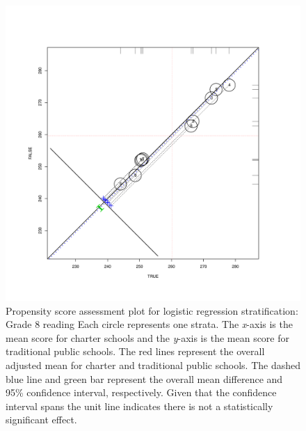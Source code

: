 \begin{figure}[h!]
\begin{center}
\includegraphics[trim=0 .7in 0 .7in]{../Figures2009/g8read-circpsa10.pdf}
\caption[Propensity score assessment plot for logistic regression stratification: Grade 8 reading]{Propensity score assessment plot for logistic regression stratification: Grade 8 reading Each circle represents one strata. The \textit{x}-axis is the mean score for charter schools and the \textit{y}-axis is the mean score for traditional public schools. The red lines represent the overall adjusted mean for charter and traditional public schools. The dashed blue line and green bar represent the overall mean difference and 95\% confidence interval, respectively. Given that the confidence interval spans the unit line indicates there is not a statistically significant effect.}
\end{center}
\end{figure}

\clearpage



